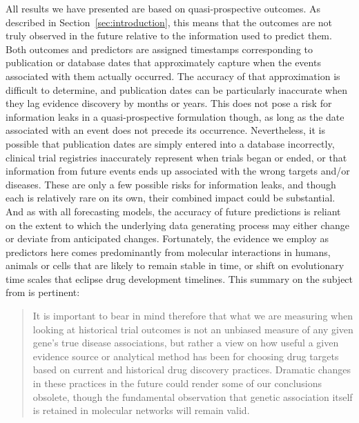 \documentclass{article}
\begin{document}
All results we have presented are based on quasi-prospective outcomes. As described in Section~\ref{sec:introduction}, this means that the outcomes are not truly observed in the future relative to the information used to predict them. Both outcomes and predictors are assigned timestamps corresponding to publication or database dates that approximately capture when the events associated with them actually occurred. The accuracy of that approximation is difficult to determine, and publication dates can be particularly inaccurate when they lag evidence discovery by months or years. This does not pose a risk for information leaks in a quasi-prospective formulation though, as long as the date associated with an event does not precede its occurrence. Nevertheless, it is possible that publication dates are simply entered into a database incorrectly, clinical trial registries inaccurately represent when trials began or ended, or that information from future events ends up associated with the wrong targets and/or diseases. These are only a few possible risks for information leaks, and though each is relatively rare on its own, their combined impact could be substantial. And as with all forecasting models, the accuracy of future predictions is reliant on the extent to which the underlying data generating process may either change or deviate from anticipated changes. Fortunately, the evidence we employ as predictors here comes predominantly from molecular interactions in humans, animals or cells that are likely to remain stable in time, or shift on evolutionary time scales that eclipse drug development timelines. This summary on the subject from \cite{PMID:33262371} is pertinent:

\begin{quotation}
  It is important to bear in mind therefore that what we are measuring when looking at historical trial outcomes is not an unbiased measure of any given gene's true disease associations, but rather a view on how useful a given evidence source or analytical method has been for choosing drug targets based on current and historical drug discovery practices. Dramatic changes in these practices in the future could render some of our conclusions obsolete, though the fundamental observation that genetic association itself is retained in molecular networks will remain valid.
\end{quotation}
\end{document}
